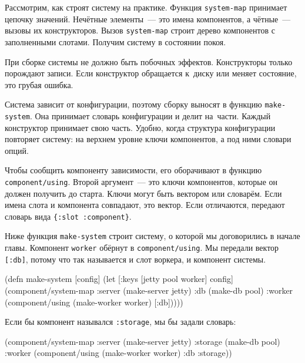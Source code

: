 
Рассмотрим, как строят систему на практике. Функция \verb|system-map| принимает
цепочку значений. Нечётные элементы~--- это имена компонентов, а чётные~--- вызовы
их конструкторов. Вызов \verb|system-map| строит дерево компонентов с
заполненными слотами. Получим систему в состоянии покоя.


При сборке системы не должно быть побочных эффектов. Конструкторы только
порождают записи. Если конструктор обращается к~диску или меняет состояние, это
грубая ошибка.

Система зависит от конфигурации, поэтому сборку выносят в функцию
\verb|make-system|. Она принимает словарь конфигурации и делит на~части. Каждый
конструктор принимает свою часть. Удобно, когда структура конфигурации повторяет
систему: на верхнем уровне ключи компонентов, а под ними словари опций.

Чтобы сообщить компоненту зависимости, его оборачивают в функцию
\verb|component/using|. Второй аргумент~--- это ключи компонентов, которые он
должен получить до старта. Ключи могут быть вектором или словарём. Если имена
слота и компонента совпадают, это вектор. Если отличаются, передают словарь вида
\verb|{:slot :component}|.

Ниже функция \verb|make-system| строит систему, о которой мы договорились в
начале главы. Компонент \verb|worker| обёрнут в \verb|component/using|. Мы
передали вектор \verb|[:db]|, потому что так называется и слот воркера, и
компонент системы.

\begin{english}
  \begin{clojure}
(defn make-system
  [config]
  (let [{:keys [jetty pool worker]} config]
    (component/system-map
     :server (make-server jetty)
     :db     (make-db pool)
     :worker (component/using
              (make-worker worker) [:db]))))
  \end{clojure}
\end{english}


\noindent
Если бы компонент назывался \verb|:storage|, мы бы задали словарь:

\begin{english}
  \begin{clojure}
(component/system-map
 :server  (make-server jetty)
 :storage (make-db pool)
 :worker  (component/using
           (make-worker worker) {:db :storage}))
  \end{clojure}
\end{english}

